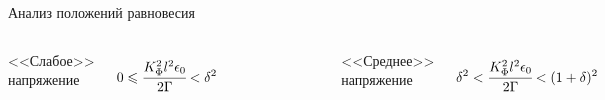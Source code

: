 \begin{frame}{Анализ положений равновесия}
\vspace{-0.9cm}
\begin{columns}
\begin{center}
	<<Слабое>> напряжение
\end{center}
\vspace{-0.2cm}
$$0 \leqslant \cfrac{K_\Phi^2 l^2 \epsilon_0}{2 \Gamma} < \delta^2$$
\vspace{-0.7cm}
\begin{figure}
	\includegraphics[width=\textwidth]{figures/equilibriums_case_1.png}
\end{figure}
\begin{center}
	<<Среднее>> напряжение
\end{center}
\vspace{-0.2cm}
$$\delta^2 < \cfrac{K_\Phi^2 l^2 \epsilon_0}{2 \Gamma} < (1 + \delta)^2$$
\vspace{-0.7cm}
\begin{figure}
	\includegraphics[width=\textwidth]{figures/equilibriums_case_2.png}

\end{figure}
\end{columns}
\end{frame}
